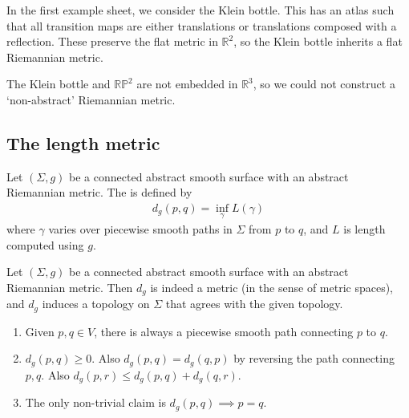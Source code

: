\begin{example}
	In the first example sheet, we consider the Klein bottle.
	This has an atlas such that all transition maps are either translations or translations composed with a reflection.
	These preserve the flat metric in $\mathbb R^2$, so the Klein bottle inherits a flat Riemannian metric.
\end{example} 

\begin{remark}
	The Klein bottle and $\mathbb R \mathbb P^2$ are not embedded in $\mathbb R^3$, so we could not construct a `non-abstract' Riemannian metric.
\end{remark} 

\subsection{The length metric}
\begin{definition}
	Let $(\Sigma, g)$ be a connected abstract smooth surface with an abstract Riemannian metric.
	The  is defined by
	\begin{align*}
		d_g(p,q) = \inf_\gamma L(\gamma)
	\end{align*}
	where $\gamma$ varies over piecewise smooth paths in $\Sigma$ from $p$ to $q$, and $L$ is length computed using $g$.
\end{definition}

\begin{proposition}
	Let $(\Sigma, g)$ be a connected abstract smooth surface with an abstract Riemannian metric.
	Then $d_g$ is indeed a metric (in the sense of metric spaces), and $d_g$ induces a topology on $\Sigma$ that agrees with the given topology.
\end{proposition}

\begin{remark}
	\begin{enumerate}
		\item Given $p, q \in V$, there is always a piecewise smooth path connecting $p$ to $q$.
		\item $d_g(p, q) \geq 0$. Also $d_g(p, q) = d_g(q, p)$ by reversing the path connecting $p, q$. Also $d_g(p, r) \leq d_g(p, q) + d_g(q, r)$.
		\item The only non-trivial claim is $d_g(p, q) \implies p = q$.
	\end{enumerate} 
\end{remark} 

